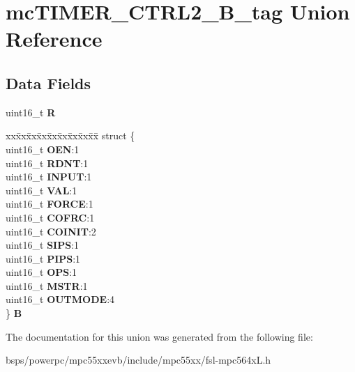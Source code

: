 \hypertarget{unionmcTIMER__CTRL2__16B__tag}{}\section{mc\+T\+I\+M\+E\+R\+\_\+\+C\+T\+R\+L2\+\_\+B\+\_\+tag Union Reference}
\label{unionmcTIMER__CTRL2__16B__tag}
\subsection*{Data Fields}
\begin{DoxyCompactItemize}
\item 
\mbox{\label{unionmcTIMER__CTRL2__16B__tag_a7d2268d82157c9d41e8542d6c9e8ab91}} 
uint16\+\_\+t {\bfseries R}
\item 
\mbox{\label{unionmcTIMER__CTRL2__16B__tag_aa4bbb37c294471a3f69ef973729e0867}} 
\begin{tabbing}
xx\=xx\=xx\=xx\=xx\=xx\=xx\=xx\=xx\=\kill
struct \{\\
\>uint16\_t {\bfseries OEN}:1\\
\>uint16\_t {\bfseries RDNT}:1\\
\>uint16\_t {\bfseries INPUT}:1\\
\>uint16\_t {\bfseries VAL}:1\\
\>uint16\_t {\bfseries FORCE}:1\\
\>uint16\_t {\bfseries COFRC}:1\\
\>uint16\_t {\bfseries COINIT}:2\\
\>uint16\_t {\bfseries SIPS}:1\\
\>uint16\_t {\bfseries PIPS}:1\\
\>uint16\_t {\bfseries OPS}:1\\
\>uint16\_t {\bfseries MSTR}:1\\
\>uint16\_t {\bfseries OUTMODE}:4\\
\} {\bfseries B}\\

\end{tabbing}\end{DoxyCompactItemize}


The documentation for this union was generated from the following file\+:\begin{DoxyCompactItemize}
\item 
bsps/powerpc/mpc55xxevb/include/mpc55xx/fsl-\/mpc564x\+L.\+h\end{DoxyCompactItemize}
